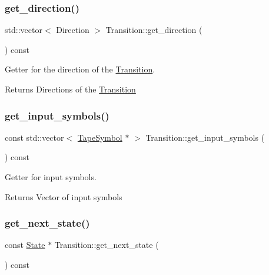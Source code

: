 \subsubsection{\texorpdfstring{get\+\_\+direction()}{get\_direction()}}
{\footnotesize\ttfamily std\+::vector$<$ Direction $>$ Transition\+::get\+\_\+direction (\begin{DoxyParamCaption}{ }\end{DoxyParamCaption}) const}



Getter for the direction of the \hyperlink{classTransition}{Transition}. 

\begin{DoxyReturn}{Returns}
Directions of the \hyperlink{classTransition}{Transition} 
\end{DoxyReturn}
\mbox{\label{classTransition_ab7c192c99fa344b7c629b7a570ae148e}} 
\subsubsection{\texorpdfstring{get\+\_\+input\+\_\+symbols()}{get\_input\_symbols()}}
{\footnotesize\ttfamily const std\+::vector$<$ \hyperlink{classTapeSymbol}{Tape\+Symbol} $\ast$ $>$ Transition\+::get\+\_\+input\+\_\+symbols (\begin{DoxyParamCaption}{ }\end{DoxyParamCaption}) const}



Getter for input symbols. 

\begin{DoxyReturn}{Returns}
Vector of input symbols 
\end{DoxyReturn}
\mbox{\label{classTransition_ae355340b9b802d1783fe3d596e9f1f6d}} 
\subsubsection{\texorpdfstring{get\+\_\+next\+\_\+state()}{get\_next\_state()}}
{\footnotesize\ttfamily const \hyperlink{classState}{State} $\ast$ Transition\+::get\+\_\+next\+\_\+state (\begin{DoxyParamCaption}{ }\end{DoxyParamCaption}) const}



